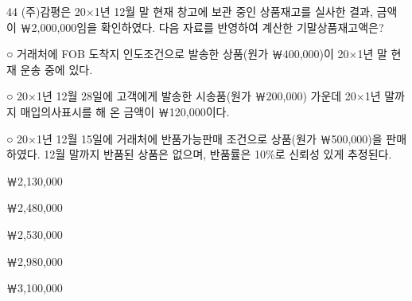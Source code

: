\begin{question}{44}
(주)감평은 20×1년 12월 말 현재 창고에 보관 중인 상품재고를 실사한 결과, 금액이 ￦2,000,000임을 확인하였다. 다음 자료를 반영하여 계산한 기말상품재고액은?
\begin{framedtext}
○ 거래처에 FOB 도착지 인도조건으로 발송한 상품(원가 ￦400,000)이 20×1년 말 현재 운송 중에 있다. \par
○ 20×1년 12월 28일에 고객에게 발송한 시송품(원가 ￦200,000) 가운데 20×1년 말까지 매입의사표시를 해 온 금액이 ￦120,000이다. \par
○ 20×1년 12월 15일에 거래처에 반품가능판매 조건으로 상품(원가 ￦500,000)을 판매하였다. 12월 말까지 반품된 상품은 없으며, 반품률은 10\%로 신뢰성 있게 추정된다.
\end{framedtext}
\begin{choices}
  \item ￦2,130,000
  \item ￦2,480,000
  \item ￦2,530,000
  \item ￦2,980,000
  \item ￦3,100,000
\end{choices}
\end{question}
